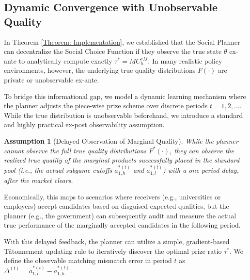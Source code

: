 \documentclass[12pt, a4paper]{article}
\newtheorem{assumption}{Assumption}
\begin{document}
\subsection{Dynamic Convergence with Unobservable Quality}

In Theorem \ref{Theorem: Implementation}, we established that the Social Planner can decentralize the Social Choice Function if they observe the true state $\theta$ ex-ante to analytically compute exactly $\tau^* = MC_h^{eff}$. In many realistic policy environments, however, the underlying true quality distributions $F(\cdot)$ are private or unobservable ex-ante. 

To bridge this informational gap, we model a dynamic learning mechanism where the planner adjusts the piece-wise prize scheme over discrete periods $t = 1, 2, \dots$. While the true distribution is unobservable beforehand, we introduce a standard and highly practical ex-post observability assumption.

\begin{assumption}[Delayed Observation of Marginal Quality]
\label{As: Delayed Observation}
    While the planner cannot observe the full true quality distributions $F^*(\cdot)$, they can observe the realized true quality of the marginal products successfully placed in the standard pool (i.e., the actual subgame cutoffs $a_{1,h}^{*(t)}$ and $a_{1,l}^{*(t)}$) with a one-period delay, after the market clears.
\end{assumption}

Economically, this maps to scenarios where receivers (e.g., universities or employers) accept candidates based on disguised expected qualities, but the planner (e.g., the government) can subsequently audit and measure the actual true performance of the marginally accepted candidates in the following period.

With this delayed feedback, the planner can utilize a simple, gradient-based Tâtonnement updating rule to iteratively discover the optimal prize ratio $\tau^*$. We define the observable matching mismatch error in period $t$ as $\Delta^{(t)} = a_{1,l}^{*(t)} - a_{1,h}^{*(t)}$. 
\end{document}
